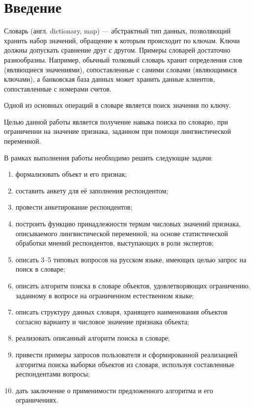 \chapter*{\hfill{\centering Введение}\hfill}


Словарь (англ. dictionary, map) --- абстрактный тип данных, позволяющий хранить набор значений, обращение к которым происходит по ключам. Ключи должны допускать сравнение друг с другом. Примеры словарей достаточно разнообразны. 
Например, обычный толковый словарь хранит определения слов (являющиеся значениями), сопоставленные с самими словами (являющимися ключами), а банковская база данных может хранить данные клиентов, сопоставленные с номерами счетов.

Одной из основных операций в словаре является поиск значения по ключу. 

Целью данной работы является получение навыка поиска по словарю, при ограничении на значение признака, заданном при помощи лингвистической переменной.

В рамках выполнения работы необходимо решить следующие задачи: 
\begin{enumerate}[label={\arabic*)}]
	\item формализовать объект и его признак;
	\item составить анкету для её заполнения респондентом;
	\item провести анкетирование респондентов;
	\item построить функцию принадлежности термам числовых значений признака, описываемого лингвистической переменной, на основе статистической обработки мнений респондентов, выступающих в роли экспертов; 
	\item описать 3--5 типовых вопросов на русском языке, имеющих целью запрос на поиск в словаре;
	\item описать алгоритм поиска в словаре объектов, удовлетворяющих ограничению. заданному в вопросе на ограниченном естественном языке;
	\item описать структуру данных словаря, хранящего наименования объектов согласно варианту и числовое значение признака объекта;
	\item реализовать описанный алгоритм поиска в словаре;
	\item привести примеры запросов пользователя и сформированной реализацией алгоритма поиска выборки объектов из словаря, используя составленные респондентами вопросы;
	\item дать заключение о применимости предложенного алгоритма и его ограничениях.
\end{enumerate}

